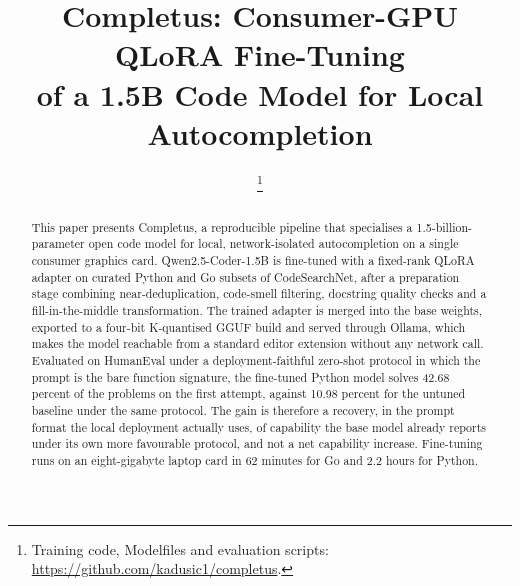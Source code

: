\documentclass[10pt,conference,a4paper]{IEEEtran}
\begin{document}
\title{Completus: Consumer-GPU QLoRA Fine-Tuning\\
of a 1.5B Code Model for Local Autocompletion}

\author{
\and
{}
\and
{}
%
\thanks{Training code, Modelfiles and evaluation scripts:
\url{https://github.com/kadusic1/completus}.}}

\maketitle
{}

\begin{abstract}
This paper presents Completus, a reproducible pipeline that specialises a
1.5-billion-parameter open code model for local, network-isolated
autocompletion on a single consumer graphics card. Qwen2.5-Coder-1.5B is
fine-tuned with a fixed-rank QLoRA adapter on curated Python and Go subsets
of CodeSearchNet, after a preparation stage combining near-deduplication,
code-smell filtering, docstring quality checks and a fill-in-the-middle
transformation. The trained adapter is merged into the base weights,
exported to a four-bit K-quantised GGUF build and served through Ollama,
which makes the model reachable from a standard editor extension without any
network call. Evaluated on HumanEval under a deployment-faithful zero-shot
protocol in which the prompt is the bare function signature, the fine-tuned
Python model solves 42.68 percent of the problems on the first attempt,
against 10.98 percent for the untuned baseline under the same protocol. The
gain is therefore a recovery, in the prompt format the local deployment
actually uses, of capability the base model already reports under its own
more favourable protocol, and not a net capability increase. Fine-tuning runs on an
eight-gigabyte laptop card in 62 minutes for Go and 2.2 hours for Python.
\end{abstract}
\end{document}
